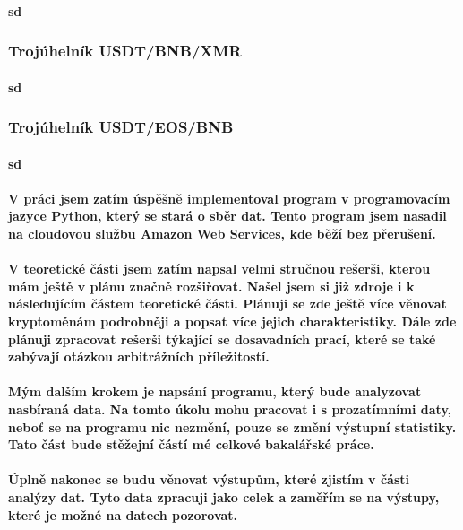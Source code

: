 \documentclass[thesis=B,czech]{FITthesis}[2019/03/21]
\begin{document}
\paragraph{
sd
}
\subsubsection{Trojúhelník USDT/BNB/XMR}
\paragraph{
sd
}
\subsubsection{Trojúhelník USDT/EOS/BNB}
\paragraph{
sd
}

\begin{conclusion}
\paragraph{
V práci jsem zatím úspěšně implementoval program v programovacím jazyce Python, který se stará o sběr dat. Tento program jsem nasadil na cloudovou službu Amazon Web Services, kde běží bez přerušení. 
}
\paragraph{
V teoretické části jsem zatím napsal velmi stručnou rešerši, kterou mám ještě v plánu značně rozšiřovat. Našel jsem si již zdroje i k následujícím částem teoretické části.  Plánuji se zde ještě více věnovat kryptoměnám podrobněji a popsat více jejich charakteristiky. Dále zde plánuji zpracovat rešerši týkající se dosavadních prací, které se také zabývají otázkou arbitrážních příležitostí.
}
\paragraph{
Mým dalším krokem je napsání programu, který bude analyzovat nasbíraná data. Na tomto úkolu mohu pracovat i s prozatímními daty, neboť se na programu nic nezmění, pouze se změní výstupní statistiky. Tato část bude stěžejní částí mé celkové bakalářské práce.
}
\paragraph{
Úplně nakonec se budu věnovat výstupům, které zjistím v části analýzy dat. Tyto data zpracuji jako celek a zaměřím se na výstupy, které je možné na datech pozorovat.
}

\end{conclusion}
\end{document}
